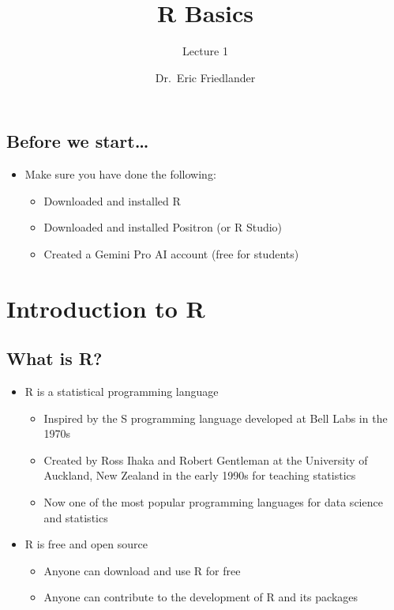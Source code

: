\documentclass[
]{article}
\title{R Basics}
\subtitle{Lecture 1}
\author{Dr.~Eric Friedlander}
\date{}
\providecommand{\tightlist}{%
  \setlength{\itemsep}{0pt}\setlength{\parskip}{0pt}}
\begin{document}
\maketitle


\subsection{Before we start\ldots{}}\label{before-we-start}

\begin{itemize}
\tightlist
\item
  Make sure you have done the following:

  \begin{itemize}
  \tightlist
  \item
    Downloaded and installed R
  \item
    Downloaded and installed Positron (or R Studio)
  \item
    Created a Gemini Pro AI account (free for students)
  \end{itemize}
\end{itemize}

\section{Introduction to R}\label{introduction-to-r}

\subsection{What is R?}\label{what-is-r}

\begin{itemize}
\tightlist
\item
  R is a statistical programming language

  \begin{itemize}
  \tightlist
  \item
    Inspired by the S programming language developed at Bell Labs in the
    1970s
  \item
    Created by Ross Ihaka and Robert Gentleman at the University of
    Auckland, New Zealand in the early 1990s for teaching statistics
  \item
    Now one of the most popular programming languages for data science
    and statistics
  \end{itemize}
\item
  R is free and open source

  \begin{itemize}
  \tightlist
  \item
    Anyone can download and use R for free
  \item
    Anyone can contribute to the development of R and its packages
  \end{itemize}
\end{itemize}
\end{document}
